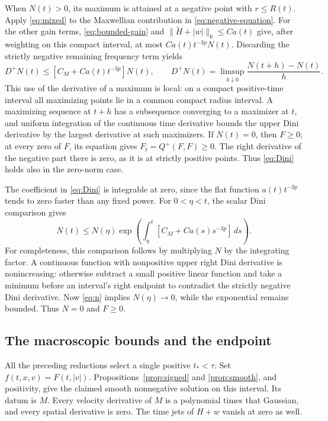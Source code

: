 \documentclass[11pt,a4paper]{article}
\numberwithin{equation}{section}
\theoremstyle{remark}
\newcommand{\dd}{\,d}
\newcommand{\norm}[2]{\lVert #1\rVert_{#2}}
\begin{document}
When \(N(t)>0\), its maximum is attained at a negative point with
\(r\leq R(t)\). Apply \eqref{eq:mixed} to the Maxwellian contribution
in \eqref{eq:negative-equation}. For the other gain terms,
\eqref{eq:bounded-gain} and
\(\norm{\widetilde H+|w|}{6}\leq Ca(t)\) give, after weighting on
this compact interval, at most \(Ca(t)t^{-3p}N(t)\).
Discarding the strictly negative remaining frequency term yields
\begin{equation}\label{eq:Dini}
 D^+N(t)\leq [C_M+Ca(t)t^{-3p}]N(t),
 \qquad D^+N(t)=\limsup_{h\downarrow0}\frac{N(t+h)-N(t)}h.
\end{equation}
This use of the derivative of a maximum is local: on a compact
positive-time interval all maximizing points lie in a common compact
radius interval. A maximizing sequence at \(t+h\) has a subsequence
converging to a maximizer at \(t\), and uniform integration of the
continuous time derivative bounds the upper Dini derivative by the
largest derivative at such maximizers.
If \(N(t)=0\), then \(F\geq0\); at every zero of \(F\), its equation
gives \(F_t=Q^+(F,F)\geq0\). The right derivative of the negative part
there is zero, as it is at strictly positive points. Thus
\eqref{eq:Dini} holds also in the zero-norm case.

The coefficient in \eqref{eq:Dini} is integrable at zero, since the
flat function \(a(t)t^{-3p}\) tends to zero faster than any fixed
power. For \(0<\eta<t\), the scalar Dini comparison gives
\[
 N(t)\leq N(\eta)
 \exp\left(\int_\eta^t[C_M+Ca(s)s^{-3p}]\dd s\right).
\]
For completeness, this comparison follows by multiplying \(N\) by
the integrating factor. A continuous function with nonpositive upper
right Dini derivative is nonincreasing: otherwise subtract a small
positive linear function and take a minimum before an interval's right
endpoint to contradict the strictly negative Dini derivative.
Now \eqref{eq:n} implies \(N(\eta)\to0\), while the exponential remains
bounded. Thus \(N=0\) and \(F\geq0\).

\subsection*{The macroscopic bounds and the endpoint}
All the preceding reductions select a single positive
\(t_*<\tau\). Set \(f(t,x,v)=F(t,|v|)\).
Propositions~\ref{prop:signed} and \ref{prop:smooth}, and positivity,
give the claimed smooth nonnegative solution on this interval.
Its datum is \(M\). Every velocity derivative of \(M\) is a polynomial
times that Gaussian, and every spatial derivative is zero.
The time jets of \(H+w\) vanish at zero as well.
\end{document}
